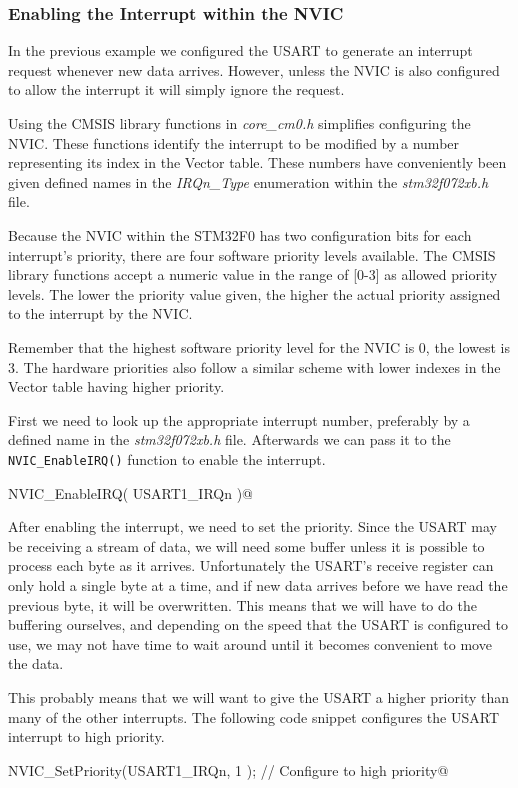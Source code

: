\documentclass[11pt,fleqn]{book} %
\makeatletter
\newcommand{\ilcode}[1]{
    \smallskip
    \colorbox{gray!20!white}{
        \centering
        \parbox{\linewidth-2\fboxsep}{
            \lstinline@#1@
        }
    }
}
\makeatother
\begin{document}
\subsubsection{Enabling the Interrupt within the NVIC} \label{nvic_setup}
In the previous example we configured the USART to generate an interrupt request whenever new data arrives. However, unless the NVIC is also configured to allow the interrupt it will simply ignore the request. 

Using the CMSIS library functions in \textit{core\_cm0.h} simplifies configuring the NVIC. These functions identify the interrupt to be modified by a number representing its index in the Vector table. These numbers have conveniently been given defined names in the \textit{IRQn\_Type} enumeration within the \textit{stm32f072xb.h} file.  

Because the NVIC within the STM32F0 has two configuration bits for each interrupt's priority, there are four software priority levels available. The CMSIS library functions accept a numeric value in the range of [0-3] as allowed priority levels. The lower the priority value given, the higher the actual priority assigned to the interrupt by the NVIC. 

\begin{warning}
    Remember that the highest software priority level for the NVIC is 0, the lowest is 3. The hardware priorities also follow a similar scheme with lower indexes in the Vector table having higher priority. 
\end{warning}



\begin{example}
   First we need to look up the appropriate interrupt number, preferably by a defined name in the \textit{stm32f072xb.h} file. Afterwards we can pass it to the \texttt{NVIC\_EnableIRQ()} function to enable the interrupt.
   
   \ilcode{NVIC\_EnableIRQ( USART1\_IRQn )}
    
    After enabling the interrupt, we need to set the priority. Since the USART may be receiving a stream of data, we will need some buffer unless it is possible to process each byte as it arrives. Unfortunately the USART's receive register can only hold a single byte at a time, and if new data arrives before we have read the previous byte, it will be overwritten. This means that we will have to do the buffering ourselves, and depending on the speed that the USART is configured to use, we may not have time to wait around until it becomes convenient to move the data.
    
    This probably means that we will want to give the USART a higher priority than many of the other interrupts. The following code snippet configures the USART interrupt to high priority.  
    
    \ilcode{NVIC\_SetPriority(USART1\_IRQn, 1 );  // Configure to high priority}
    \smallskip
\end{example}
\end{document}
